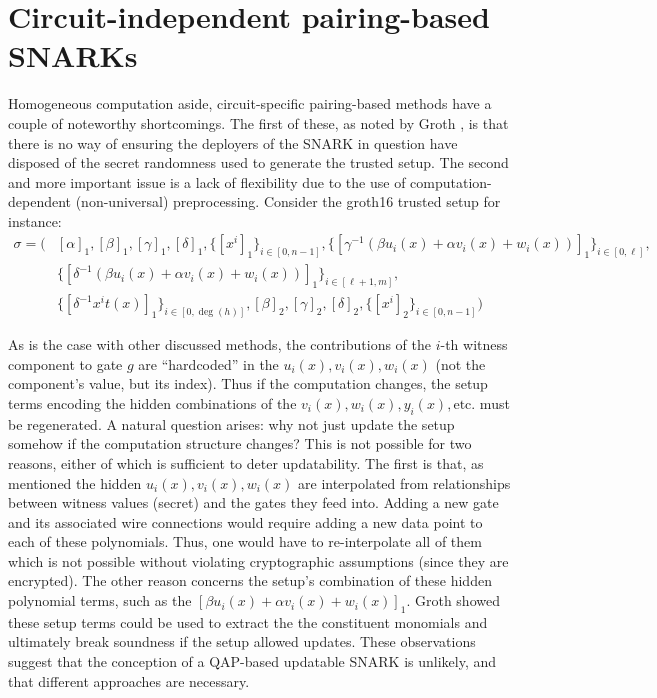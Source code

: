 \section{Circuit-independent pairing-based SNARKs}
\noindent Homogeneous computation aside, circuit-specific pairing-based methods have a couple of noteworthy shortcomings. The first of these, as noted by Groth \cite{grothupdatable}, is that there is no way of ensuring the deployers of the SNARK in question have disposed of the secret randomness used to generate the trusted setup. The second and more important issue is a lack of flexibility due to the use of computation-dependent (non-universal) preprocessing. Consider the groth16 trusted setup for instance: 
\begin{align}
\sigma = \Big( 
    &[\alpha]_1, [\beta]_1, [\gamma]_1, [\delta]_1, \{[x^i]_1\}_{i \in [0, n-1]}, \{[\gamma^{-1}(\beta u_i(x) + \alpha v_i(x) + w_i(x))]_1\}_{i \in [0, \ell]}, \\
    &\{[\delta^{-1}(\beta u_i(x) + \alpha v_i(x) + w_i(x))]_1\}_{i \in [\ell+1, m]}, \\
    &\{[\delta^{-1} x^i t(x)]_1\}_{i \in [0, \deg(h)]}, [\beta]_2, [\gamma]_2, [\delta]_2, \{[x^i]_2\}_{i \in [0, n-1]}
\Big)
\end{align}

\noindent As is the case with other discussed methods, the contributions of the $i$-th witness component to gate $g$ are ``hardcoded'' in the $u_i(x), v_i(x), w_i(x)$ (not the component's value, but its index). Thus if the computation changes, the setup terms encoding the hidden combinations of the $v_i(x), w_i(x), y_i(x), \text{etc.}$ must be regenerated. A natural question arises: why not just update the setup somehow if the computation structure changes? This is not possible for two reasons, either of which is sufficient to deter updatability. The first is that, as mentioned the hidden $u_i(x), v_i(x), w_i(x)$ are interpolated from relationships between witness values (secret) and the gates they feed into. Adding a new gate and its associated wire connections would require adding a new data point to each of these polynomials. Thus, one would have to re-interpolate all of them which is not possible without violating cryptographic assumptions (since they are encrypted). The other reason concerns the setup's combination of these hidden polynomial terms, such as the $[\beta u_i(x) + \alpha v_i(x) + w_i(x)]_1$. Groth \cite{grothupdatable} showed these setup terms could be used to extract the the constituent monomials and ultimately break soundness if the setup allowed updates. These observations suggest that the conception of a QAP-based updatable SNARK is unlikely, and that different approaches are necessary.\\

